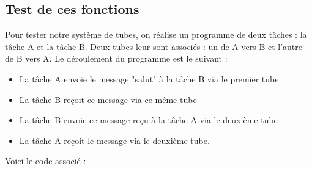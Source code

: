 \documentclass[a4paper,12pt]{report}
\begin{document}
\subsection{Test de ces fonctions}
Pour tester notre système de tubes, on réalise un programme de deux tâches : la tâche A et la tâche B. Deux tubes leur sont associés : un de A vers B et l'autre de B vers A. Le déroulement du programme est le suivant :
\begin{itemize}
\item La tâche A envoie le message "salut" à la tâche B via le premier tube
\item La tâche B reçoit ce message via ce même tube
\item La tâche B envoie ce message reçu à la tâche A via le deuxième tube
\item La tâche A reçoit le message via le deuxième tube.
\end{itemize}

Voici le code associé :
\end{document}
